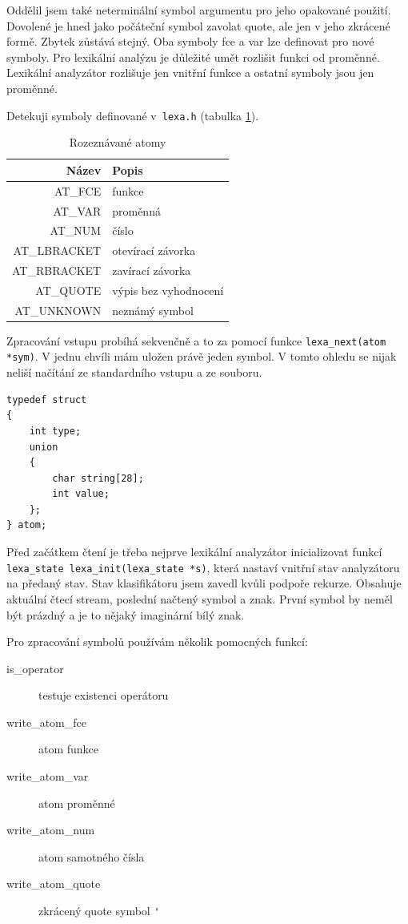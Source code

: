 \documentclass[a4paper, 12pt]{article}
\begin{document}
Oddělil jsem také neterminální symbol argumentu pro jeho opakované
použití. Dovolené je hned jako počáteční symbol zavolat quote,
ale jen v jeho zkrácené formě. Zbytek zůstává stejný. Oba symboly
fce a var lze definovat pro nové symboly. Pro lexikální analýzu
je důležité umět rozlišit funkci od proměnné. Lexikální analyzátor
rozlišuje jen vnitřní funkce a ostatní symboly jsou jen proměnné.

Detekuji symboly definované v~\texttt{lexa.h} (tabulka
\ref{tab:atom}).

\begin{table}
\centering
\begin{tabular}{|r|l|}
\hline
Název & Popis\\ \hline\hline
AT\_FCE & funkce\\ \hline
AT\_VAR & proměnná\\ \hline
AT\_NUM & číslo\\ \hline
AT\_LBRACKET & otevírací závorka\\ \hline
AT\_RBRACKET & zavírací závorka\\ \hline
AT\_QUOTE & výpis bez vyhodnocení\\ \hline
AT\_UNKNOWN & neznámý symbol\\
\hline
\end{tabular}
\caption{Rozeznávané atomy}
\label{tab:atom}
\end{table}

Zpracování vstupu probíhá sekvenčně a to za pomocí funkce \verb+lexa_next(atom *sym)+.
V jednu chvíli mám uložen právě jeden symbol. V tomto ohledu se nijak
neliší načítání ze standardního vstupu a ze souboru.

\begin{lstlisting}
typedef struct
{
    int type;
    union
    {
        char string[28];
        int value;
    };
} atom;
\end{lstlisting}

Před začátkem čtení je třeba nejprve lexikální analyzátor inicializovat
funkcí \verb+lexa_state lexa_init(lexa_state *s)+, která nastaví vnitřní
stav analyzátoru na předaný stav. Stav klasifikátoru jsem zavedl kvůli
podpoře rekurze. Obsahuje aktuální čtecí stream, poslední načtený symbol
a znak. První symbol by neměl být prázdný a je to nějaký imaginární
bílý znak.

Pro zpracování symbolů používám několik pomocných funkcí:
\begin{description}
  \item[is\_operator] testuje existenci operátoru
  \item[write\_atom\_fce] atom funkce
  \item[write\_atom\_var] atom proměnné
  \item[write\_atom\_num] atom samotného čísla
  \item[write\_atom\_quote] zkrácený quote symbol \verb+'+
\end{description}
\end{document}
